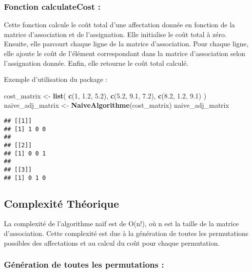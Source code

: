 \documentclass[
]{article}
\newenvironment{Shaded}{\begin{snugshade}}{\end{snugshade}}
\newcommand{\DecValTok}[1]{\textcolor[rgb]{0.00,0.00,0.81}{#1}}
\newcommand{\FloatTok}[1]{\textcolor[rgb]{0.00,0.00,0.81}{#1}}
\newcommand{\FunctionTok}[1]{\textcolor[rgb]{0.13,0.29,0.53}{\textbf{#1}}}
\newcommand{\NormalTok}[1]{#1}
\newcommand{\OtherTok}[1]{\textcolor[rgb]{0.56,0.35,0.01}{#1}}
\begin{document}
\hypertarget{fonction-calculatecost}{%
\subsubsection{Fonction calculateCost :}\label{fonction-calculatecost}}

Cette fonction calcule le coût total d'une affectation donnée en
fonction de la matrice d'association et de l'assignation. Elle
initialise le coût total à zéro. Ensuite, elle parcourt chaque ligne de
la matrice d'association. Pour chaque ligne, elle ajoute le coût de
l'élément correspondant dans la matrice d'association selon
l'assignation donnée. Enfin, elle retourne le coût total calculé.

Exemple d'utilisation du package :

\begin{Shaded}
\begin{Highlighting}[]
\NormalTok{cost\_matrix }\OtherTok{\textless{}{-}} \FunctionTok{list}\NormalTok{(}
  \FunctionTok{c}\NormalTok{(}\DecValTok{1}\NormalTok{, }\FloatTok{1.2}\NormalTok{, }\FloatTok{5.2}\NormalTok{),}
  \FunctionTok{c}\NormalTok{(}\FloatTok{5.2}\NormalTok{, }\FloatTok{9.1}\NormalTok{, }\FloatTok{7.2}\NormalTok{),}
  \FunctionTok{c}\NormalTok{(}\FloatTok{8.2}\NormalTok{, }\FloatTok{1.2}\NormalTok{, }\FloatTok{9.1}\NormalTok{)}
\NormalTok{)}
\NormalTok{naive\_adj\_matrix }\OtherTok{\textless{}{-}} \FunctionTok{NaiveAlgorithme}\NormalTok{(cost\_matrix)}
\NormalTok{naive\_adj\_matrix}
\end{Highlighting}
\end{Shaded}

\begin{verbatim}
## [[1]]
## [1] 1 0 0
## 
## [[2]]
## [1] 0 0 1
## 
## [[3]]
## [1] 0 1 0
\end{verbatim}

\hypertarget{complexituxe9-thuxe9orique}{%
\subsection{Complexité Théorique}\label{complexituxe9-thuxe9orique}}

La complexité de l'algorithme naïf est de O(n!), où n est la taille de
la matrice d'association. Cette complexité est due à la génération de
toutes les permutations possibles des affectations et au calcul du coût
pour chaque permutation.

\hypertarget{guxe9nuxe9ration-de-toutes-les-permutations}{%
\subsubsection{Génération de toutes les permutations
:}\label{guxe9nuxe9ration-de-toutes-les-permutations}}
\end{document}
